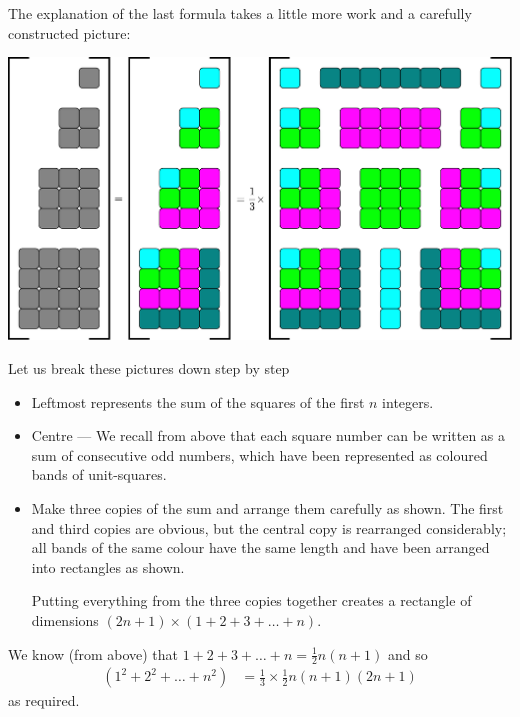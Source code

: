 The explanation of the last formula takes a little more work and a carefully
constructed picture:
\begin{center}
 \includegraphics[width=\textwidth]{sums2}
\end{center}
Let us break these pictures down step by step
\begin{itemize}
 \item Leftmost represents the sum of the squares of the first $n$ integers.
 \item Centre --- We recall from above that each square number can be written as a sum of
consecutive odd numbers, which have been represented as coloured bands of unit-squares.
 \item Make three copies of the sum and arrange them carefully as shown. The first and
third copies are obvious, but the central copy is rearranged considerably; all
bands of the same colour have the same length and have been arranged into
rectangles as shown.

Putting everything from the three copies together creates a rectangle of dimensions
$(2n+1)\times(1+2+3+\dots+n)$.
\end{itemize}
We know (from above) that $1+2+3+\dots+n = \frac{1}{2} n(n+1)$ and so
\begin{align*}
  (1^2+2^2+\dots+n^2 ) &= \frac{1}{3} \times \frac{1}{2} n(n+1)(2n+1)
\end{align*}
as required.

